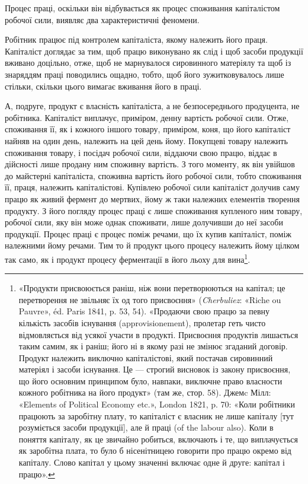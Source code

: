 
Процес праці, оскільки він відбувається як процес споживання
капіталістом робочої сили, виявляє два характеристичні феномени.

Робітник працює під контролем капіталіста, якому належить
його праця. Капіталіст доглядає за тим, щоб працю виконувано
як слід і щоб засоби продукції вживано доцільно, отже, щоб не
марнувалося сировинного матеріялу та щоб із знаряддям праці
поводились ощадно, тобто, щоб його зужитковувалось лише
стільки, скільки цього вимагає вживання його в праці.

А, подруге, продукт є власність капіталіста, а не безпосереднього
продуцента, не робітника. Капіталіст виплачує, приміром,
денну вартість робочої сили. Отже, споживання її, як і кожного
іншого товару, приміром, коня, що його капіталіст найняв на
один день, належить на цей день йому. Покупцеві товару належить
споживання товару, і посідач робочої сили, віддаючи свою
працю, віддає в дійсності лише продану ним споживну вартість.
З того моменту, як він увійшов до майстерні капіталіста, споживна
вартість його робочої сили, тобто споживання її, праця, належить
капіталістові. Купівлею робочої сили капіталіст долучив саму
працю як живий фермент до мертвих, йому ж таки належних
елементів творення продукту. З його погляду процес праці є
лише споживання купленого ним товару, робочої сили, яку він
може однак споживати, лише долучивши до неї засоби продукції.
Процес праці є процес поміж речами, що їх купив капіталіст,
поміж належними йому речами. Тим то й продукт цього процесу
належить йому цілком так само, як і продукт процесу ферментації
в його льоху для вина\footnote{
«Продукти присвоюється раніш, ніж вони перетворюються на
капітал; це перетворення не звільняє їх од того присвоєння» (\emph{Cherbuliez}:
«Riche ou Pauvre», éd. Paris 1841, p. 53, 54). «Продаючи свою
працю за певну кількість засобів існування (approvisionement), пролетар
геть чисто відмовляється від усякої участи в продукті. Присвоєння продуктів
лишається таким самим, як і раніш; його ні в якому разі не змінює
згаданий договір. Продукт належить виключно капіталістові, який постачав
сировинний матеріял і засоби існування. Це — строгий висновок
із закону присвоєння, що його основним принципом було, навпаки, виключне
право власности кожного робітника на його продукт» (там же,
стор. 58). Джемc Мілл: «Elements of Political Economy etc.», London
1821, p. 70: «Коли робітники працюють за заробітну плату, то капіталіст
є власник не лише капіталу [тут розуміється засоби продукції], але
й праці (of the labour also). Коли в поняття капіталу, як це звичайно
робиться, включають і те, що виплачується як заробітна плата, то було б
нісенітницею говорити про працю окремо від капіталу. Слово капітал у
цьому значенні включає одне й друге: капітал і працю».
}.

